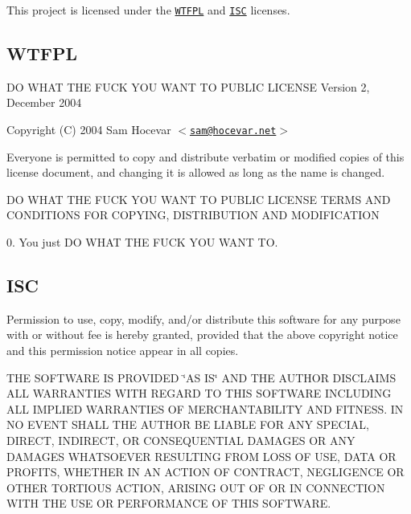 This project is licensed under the \href{https://en.wikipedia.org/wiki/WTFPL}{\tt W\+T\+F\+PL} and \href{https://opensource.org/licenses/ISC}{\tt I\+SC} licenses.

\subsection*{W\+T\+F\+PL}

DO W\+H\+AT T\+HE F\+U\+CK Y\+OU W\+A\+NT TO P\+U\+B\+L\+IC L\+I\+C\+E\+N\+SE Version 2, December 2004

Copyright (C) 2004 Sam Hocevar $<$\href{mailto:sam@hocevar.net}{\tt sam@hocevar.\+net}$>$

Everyone is permitted to copy and distribute verbatim or modified copies of this license document, and changing it is allowed as long as the name is changed.

DO W\+H\+AT T\+HE F\+U\+CK Y\+OU W\+A\+NT TO P\+U\+B\+L\+IC L\+I\+C\+E\+N\+SE T\+E\+R\+MS A\+ND C\+O\+N\+D\+I\+T\+I\+O\+NS F\+OR C\+O\+P\+Y\+I\+NG, D\+I\+S\+T\+R\+I\+B\+U\+T\+I\+ON A\+ND M\+O\+D\+I\+F\+I\+C\+A\+T\+I\+ON

0. You just DO W\+H\+AT T\+HE F\+U\+CK Y\+OU W\+A\+NT TO.

\subsection*{I\+SC}

Permission to use, copy, modify, and/or distribute this software for any purpose with or without fee is hereby granted, provided that the above copyright notice and this permission notice appear in all copies.

T\+HE S\+O\+F\+T\+W\+A\+RE IS P\+R\+O\+V\+I\+D\+ED \char`\"{}\+A\+S I\+S\char`\"{} A\+ND T\+HE A\+U\+T\+H\+OR D\+I\+S\+C\+L\+A\+I\+MS A\+LL W\+A\+R\+R\+A\+N\+T\+I\+ES W\+I\+TH R\+E\+G\+A\+RD TO T\+H\+IS S\+O\+F\+T\+W\+A\+RE I\+N\+C\+L\+U\+D\+I\+NG A\+LL I\+M\+P\+L\+I\+ED W\+A\+R\+R\+A\+N\+T\+I\+ES OF M\+E\+R\+C\+H\+A\+N\+T\+A\+B\+I\+L\+I\+TY A\+ND F\+I\+T\+N\+E\+SS. IN NO E\+V\+E\+NT S\+H\+A\+LL T\+HE A\+U\+T\+H\+OR BE L\+I\+A\+B\+LE F\+OR A\+NY S\+P\+E\+C\+I\+AL, D\+I\+R\+E\+CT, I\+N\+D\+I\+R\+E\+CT, OR C\+O\+N\+S\+E\+Q\+U\+E\+N\+T\+I\+AL D\+A\+M\+A\+G\+ES OR A\+NY D\+A\+M\+A\+G\+ES W\+H\+A\+T\+S\+O\+E\+V\+ER R\+E\+S\+U\+L\+T\+I\+NG F\+R\+OM L\+O\+SS OF U\+SE, D\+A\+TA OR P\+R\+O\+F\+I\+TS, W\+H\+E\+T\+H\+ER IN AN A\+C\+T\+I\+ON OF C\+O\+N\+T\+R\+A\+CT, N\+E\+G\+L\+I\+G\+E\+N\+CE OR O\+T\+H\+ER T\+O\+R\+T\+I\+O\+US A\+C\+T\+I\+ON, A\+R\+I\+S\+I\+NG O\+UT OF OR IN C\+O\+N\+N\+E\+C\+T\+I\+ON W\+I\+TH T\+HE U\+SE OR P\+E\+R\+F\+O\+R\+M\+A\+N\+CE OF T\+H\+IS S\+O\+F\+T\+W\+A\+RE. 